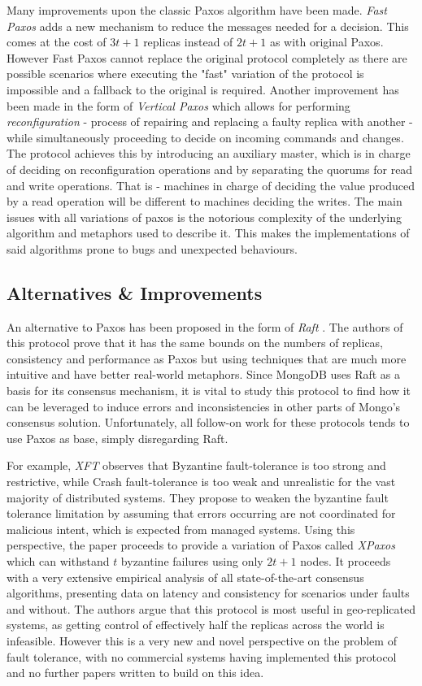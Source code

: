 Many improvements upon the classic Paxos algorithm have been made. \textit{Fast Paxos} \citep{fast-paxos} adds a new mechanism to reduce the messages needed for a decision. This comes at the cost of $3t+1$ replicas instead of $2t+1$ as with original Paxos. However Fast Paxos cannot replace the original protocol completely as there are possible scenarios where executing the "fast" variation of the protocol is impossible and a fallback to the original is required. Another improvement has been made in the form of \textit{Vertical Paxos} \citep{vertical-paxos} which allows for performing \textit{reconfiguration} - process of repairing and replacing a faulty replica with another - while simultaneously proceeding to decide on incoming commands and changes. The protocol achieves this by introducing an auxiliary master, which is in charge of deciding on reconfiguration operations and by separating the quorums for read and write operations. That is - machines in charge of deciding the value produced by a read operation will be different to machines deciding the writes. The main issues with all variations of paxos is the notorious complexity of the underlying algorithm and metaphors used to describe it. This makes the implementations of said algorithms prone to bugs and unexpected behaviours.

\subsection{Alternatives \& Improvements}
An alternative to Paxos has been proposed in the form of \textit{Raft} \citep{raft}. The authors of this protocol prove that it has the same bounds on the numbers of replicas, consistency and performance as Paxos but using techniques that are much more intuitive and have better real-world metaphors. Since MongoDB uses Raft as a basis for its consensus mechanism, it is vital to study this protocol to find how it can be leveraged to induce errors and inconsistencies in other parts of Mongo's consensus solution. Unfortunately, all follow-on work for these protocols tends to use Paxos as base, simply disregarding Raft.

For example, \textit{XFT} \citep{xft} observes that Byzantine fault-tolerance is too strong and restrictive, while Crash fault-tolerance is too weak and unrealistic for the vast majority of distributed systems. They propose to weaken the byzantine fault tolerance limitation by assuming that errors occurring are not coordinated for malicious intent, which is expected from managed systems. Using this perspective, the paper proceeds to provide a variation of Paxos called \textit{XPaxos} which can withstand $t$ byzantine failures using only $2t+1$ nodes. It proceeds with a very extensive empirical analysis of all state-of-the-art consensus algorithms, presenting data on latency and consistency for scenarios under faults and without. The authors argue that this protocol is most useful in geo-replicated systems, as getting control of effectively half the replicas across the world is infeasible. However this is a very new and novel perspective on the problem of fault tolerance, with no commercial systems having implemented this protocol and no further papers written to build on this idea.

